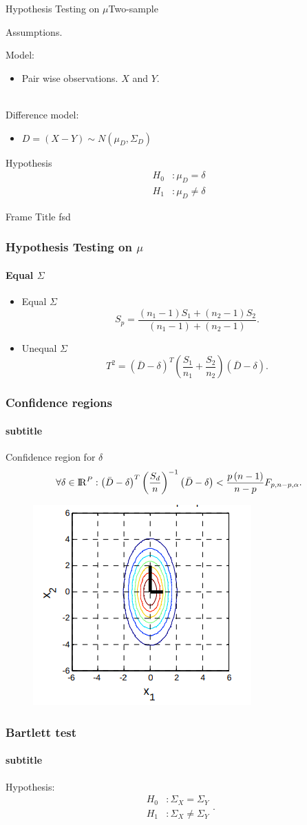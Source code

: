 \documentclass[aspectratio=169,10pt,t]{beamer}
\begin{document}
\begin{frame}{Hypothesis Testing on $\mu$}{Two-sample}

	Assumptions.
	
	Model:
	\begin{itemize}
		\item Pair wise observations. $X$ and $Y$.
	\end{itemize}
	\\
	Difference model:
	\begin{itemize}
		\item 
			$ D =   \left( X - Y  \right)  \sim N \left( \mu_D, \Sigma_D  \right)  $
	\end{itemize}

	Hypothesis
	\begin{align*}
		H_0&: \mu_D = \delta\\
		H_1&: \mu_D \neq \delta
	\end{align*}

\end{frame}
\begin{frame}
{Frame Title}
    fsd
\end{frame}
\begin{frame}[t]
	\frametitle{Hypothesis Testing on $\mu$}
	\framesubtitle{Equal $\Sigma$}
	\begin{itemize}
		\item Equal $\Sigma$\\
			\[
			S_p = 
			\frac{  \left( n_1 -1  \right) S_1 +  \left( n_2 -1  \right) S_2}
			{ \left( n_1 -1  \right) +  \left( n_2 -1  \right) } 
			.\] 
		\item Unequal $\Sigma$ 
			\[
			T^{2} =
			\left( \bar{D} - \delta  \right) ^{T}
			\left( \frac{S_1}{n_1} + \frac{S_2}{n_2}  \right) 
			\left( \bar{D} - \delta  \right)
			.\] 
	\end{itemize}
\end{frame}
\begin{frame}[t]
	\frametitle{Confidence regions}
	\framesubtitle{subtitle}
	Confidence region for $\delta$
	\[
		\forall \delta \in {\rm I\!R}^{P}:
		\left( \bar{D} - \delta  \right) ^{T}
		\left( \frac{S_d}{n}  \right) ^{-1}
		\left( \bar{D} - \delta  \right)
		<
		\frac{p  \left( n-1 \right) }{n-p} 
		F_{p,n-p,\alpha}
	.\] 
	\begin{figure}[h]
		\centering
		\includegraphics[width=0.35\linewidth]{../01/images/1.png}
	\end{figure}
\end{frame}

\begin{frame}[t]
	\frametitle{Bartlett test}
	\framesubtitle{subtitle}
	Hypothesis:
	\[
		\begin{aligned}
			H_0 &: \Sigma_X = \Sigma_Y\\
			H_1 &: \Sigma_X \neq \Sigma_Y
		\end{aligned}
	.\] 
\end{frame}
\end{document}
